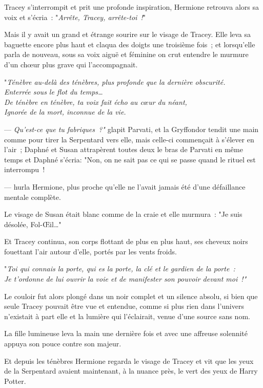 Tracey s'interrompit et prit une profonde inspiration, Hermione retrouva alors sa voix et s'écria~: "\emph{Arrête, Tracey, arrête-toi~!}"

Mais il y avait un grand et étrange sourire sur le visage de Tracey. Elle leva sa baguette encore plus haut et claqua des doigts une troisième fois~; et lorsqu'elle parla de nouveau, sous sa voix aiguë et féminine on crut entendre le murmure d'un chœur plus grave qui l'accompagnait.

"\emph{Ténèbre au-delà des ténèbres, plus profonde que la dernière obscurité.\\
Enterrée sous le flot du temps…\\
De ténèbre en ténèbre, ta voix fait écho au cœur du néant,\\
Ignorée de la mort, inconnue de la vie.}

--- \emph{Qu'est-ce que tu fabriques~?"} glapit Parvati, et la Gryffondor tendit une main comme pour tirer la Serpentard vers elle, mais celle-ci commençait à s'élever en l'air~; Daphné et Susan attrapèrent toutes deux le bras de Parvati en même temps et Daphné s'écria: "Non, on ne sait pas ce qui se passe quand le rituel est interrompu~!

---  hurla Hermione, plus proche qu'elle ne l'avait jamais été d'une défaillance mentale complète.

Le visage de Susan était blanc comme de la craie et elle murmura~: "Je suis désolée, Fol-Œil…"

Et Tracey continua, son corps flottant de plus en plus haut, ses cheveux noirs fouettant l'air autour d'elle, portés par les vents froids.

"\emph{Toi qui connais la porte, qui es la porte, la clé et le gardien de la porte~:\\ Je t'ordonne de lui ouvrir la voie et de manifester son pouvoir devant moi~!"}

Le couloir fut alors plongé dans un noir complet et un silence absolu, si bien que seule Tracey pouvait être vue et entendue, comme si plus rien dans l'univers n'existait à part elle et la lumière qui l'éclairait, venue d'une source sans nom.

La fille lumineuse leva la main une dernière fois et avec une affreuse solennité appuya son pouce contre son majeur.

Et depuis les ténèbres Hermione regarda le visage de Tracey et vit que les yeux de la Serpentard avaient maintenant, à la nuance près, le vert des yeux de Harry Potter.

